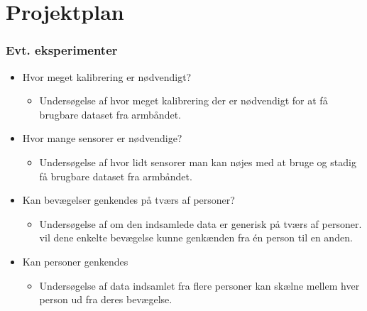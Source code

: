 \thispagestyle{fancy}
\chapter{Projektplan}
\subsection*{Evt. eksperimenter}
\begin{itemize}
	\item Hvor meget kalibrering er nødvendigt?
	\begin{itemize}
		\item Undersøgelse af hvor meget kalibrering der er nødvendigt for at få brugbare dataset fra armbåndet.
	\end{itemize}
	\item Hvor mange sensorer er nødvendige?
	\begin{itemize}
		\item Undersøgelse af hvor lidt sensorer man kan nøjes med at bruge og stadig få brugbare dataset fra armbåndet.
	\end{itemize}
	\item Kan bevægelser genkendes på tværs af personer?
	\begin{itemize}
		\item Undersøgelse af om den indsamlede data er generisk på tværs af personer. vil dene enkelte bevægelse kunne genkænden fra én person til en anden.
	\end{itemize}
	\item Kan personer genkendes
	\begin{itemize}
		\item Undersøgelse af data indsamlet fra flere personer kan skælne mellem hver person ud fra deres bevægelse.
		\end{itemize}
\end{itemize}